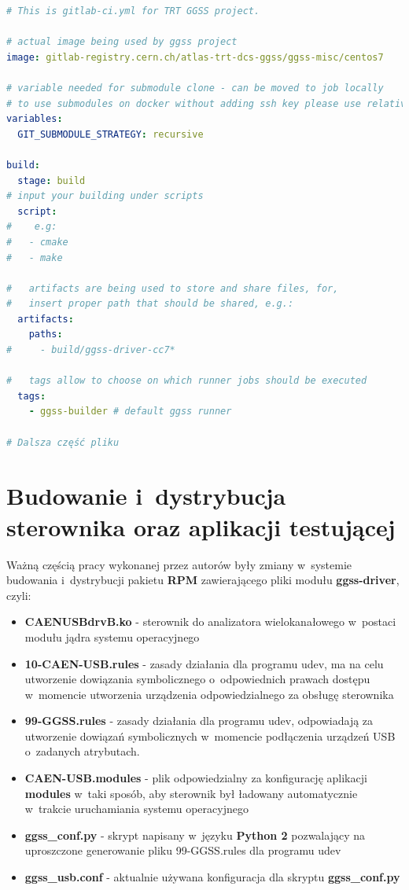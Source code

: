 \begin{lstlisting}[language=yaml, caption={Fragment szablonu ułatwiającego pisanie plików \textit{.gitlab-ci.yml} znajdującego się w~repozytorium \textit{aux}}, label={lst:ggsscicdtempl}]
# This is gitlab-ci.yml for TRT GGSS project.

# actual image being used by ggss project
image: gitlab-registry.cern.ch/atlas-trt-dcs-ggss/ggss-misc/centos7

# variable needed for submodule clone - can be moved to job locally
# to use submodules on docker without adding ssh key please use relative submodules path
variables:
  GIT_SUBMODULE_STRATEGY: recursive

build:
  stage: build
# input your building under scripts
  script:
#    e.g:
#   - cmake
#   - make

#   artifacts are being used to store and share files, for,
#   insert proper path that should be shared, e.g.:
  artifacts:
    paths:
#     - build/ggss-driver-cc7*

#   tags allow to choose on which runner jobs should be executed
  tags:
    - ggss-builder # default ggss runner

# Dalsza część pliku

\end{lstlisting}


\newpage
\section{Budowanie i~dystrybucja sterownika oraz aplikacji testującej}
\label{section:driver}

Ważną częścią pracy wykonanej przez autorów były zmiany w~systemie budowania i~dystrybucji pakietu \textbf{RPM} zawierającego pliki modułu \textbf{ggss-driver}, czyli:
\begin{itemize}
\item \textbf{CAENUSBdrvB.ko} - sterownik do analizatora wielokanałowego w~postaci modułu jądra systemu operacyjnego
\item \textbf{10-CAEN-USB.rules} - zasady działania dla programu udev, ma na celu utworzenie dowiązania symbolicznego o~odpowiednich prawach dostępu w~momencie utworzenia urządzenia odpowiedzialnego za obsługę sterownika
\item \textbf{99-GGSS.rules} - zasady działania dla programu udev, odpowiadają za utworzenie dowiązań symbolicznych w~momencie podłączenia urządzeń USB o~zadanych atrybutach.
\item \textbf{CAEN-USB.modules} - plik odpowiedzialny za konfigurację aplikacji \textbf{modules} w~taki sposób, aby sterownik był ładowany automatycznie w~trakcie uruchamiania systemu operacyjnego
\item \textbf{ggss\_conf.py} - skrypt napisany w~języku \textbf{Python 2} pozwalający na uproszczone generowanie pliku 99-GGSS.rules dla programu udev
\item \textbf{ggss\_usb.conf} - aktualnie używana konfiguracja dla skryptu \textbf{ggss\_conf.py}
\end{itemize}

